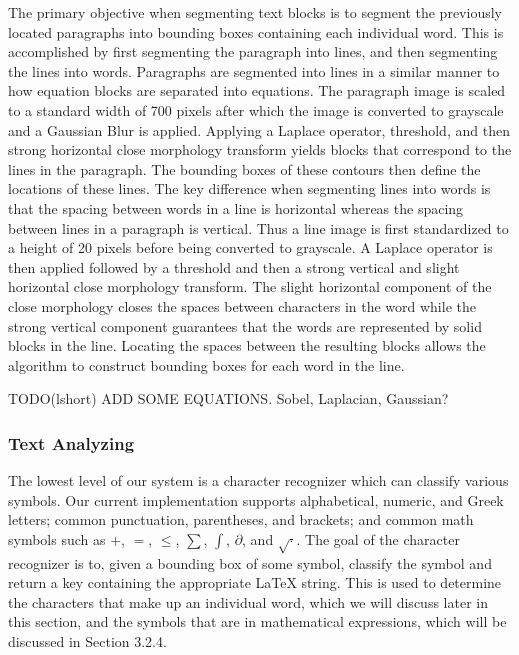 \documentclass[12pt]{IEEEtran}
\newcommand{\latex}{\LaTeX\xspace}
\begin{document}
The primary objective when segmenting text blocks is to segment the previously located paragraphs into bounding boxes containing each individual word. This is accomplished by first segmenting the paragraph into lines, and then segmenting the lines into words. Paragraphs are segmented into lines in a similar manner to how equation blocks are separated into equations. The paragraph image is scaled to a standard width of 700 pixels after which the image is converted to grayscale and a Gaussian Blur is applied. Applying a Laplace operator, threshold, and then strong horizontal close morphology transform yields blocks that correspond to the lines in the paragraph. The bounding boxes of these contours then define the locations of these lines. The key difference when segmenting lines into words is that the spacing between words in a line is horizontal whereas the spacing between lines in a paragraph is vertical. Thus a line image is first standardized to a height of 20 pixels before being converted to grayscale. A Laplace operator is then applied followed by a threshold and then a strong vertical and slight horizontal close morphology transform. The slight horizontal component of the close morphology closes the spaces between characters in the word while the strong vertical component guarantees that the words are represented by solid blocks in the line. Locating the spaces between the resulting blocks allows the algorithm to construct bounding boxes for each word in the line.

TODO(lshort) ADD SOME EQUATIONS. Sobel, Laplacian, Gaussian?

\subsubsection{Text Analyzing}

The lowest level of our system is a character recognizer which can classify various symbols. Our current implementation supports alphabetical, numeric, and Greek letters; common punctuation, parentheses, and brackets; and common math symbols such as $+$, $=$,  $\le$, $\sum$, $\int$, $\partial$, and $\sqrt{\cdot}$. The goal of the character recognizer is to, given a bounding box of some symbol, classify the symbol and return a key containing the appropriate \latex string. This is used to determine the characters that make up an individual word, which we will discuss later in this section, and the symbols that are in mathematical expressions, which will be discussed in Section 3.2.4.
\end{document}
